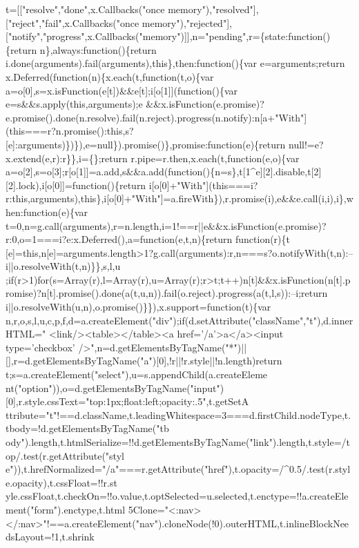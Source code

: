 \begin{DoxyCode}
{       t=[["resolve","done",x.Callbacks("once memory"),"resolved"],["reject","fail",x.Callbacks("once
       memory"),"rejected"],["notify","progress",x.Callbacks("memory")]],n="pending",r=\{state:function()\{return n\},always:function()\{return
       i.done(arguments).fail(arguments),this\},then:function()\{var e=arguments;return
       x.Deferred(function(n)\{x.each(t,function(t,o)\{var a=o[0],s=x.isFunction(e[t])&&e[t];i[o[1]](function()\{var
       e=s&&s.apply(this,arguments);e
      &&x.isFunction(e.promise)?e.promise().done(n.resolve).fail(n.reject).progress(n.notify):n[a+"With"](this===r?n.promise():this,s?[e]:arguments)\})\}),e=null\}).promise()\},promise:function(e)\{return
       null!=e?x.extend(e,r):r\}\},i=\{\};return r.pipe=r.then,x.each(t,function(e,o)\{var
       a=o[2],s=o[3];r[o[1]]=a.add,s&&a.add(function()\{n=s\},t[1^e][2].disable,t[2][2].lock),i[o[0]]=function()\{return
       i[o[0]+"With"](this===i?r:this,arguments),this\},i[o[0]+"With"]=a.fireWith\}),r.promise(i),e&&e.call(i,i),i\},when:function(e)\{var
       t=0,n=g.call(arguments),r=n.length,i=1!==r||e&&x.isFunction(e.promise)?r:0,o=1===i?e:x.Deferred(),a=function(e,t,n)\{return
       function(r)\{t
      [e]=this,n[e]=arguments.length>1?g.call(arguments):r,n===s?o.notifyWith(t,n):--i||o.resolveWith(t,n)\}\},s,l,u
      ;if(r>1)for(s=Array(r),l=Array(r),u=Array(r);r>t;t++)n[t]&&x.isFunction(n[t].promise)?n[t].promise().done(a(t,u,n)).fail(o.reject).progress(a(t,l,s)):--i;return
       i||o.resolveWith(u,n),o.promise()\}\}),x.support=function(t)\{var n,r,o,s,l,u,c,p,f,d=a.createElement("div");if(d.setAttribute("className","t"),d.innerHTML=" 
       <link/><table></table><a href='}/a\textcolor{stringliteral}{'>a</a><input type='}checkbox\textcolor{stringliteral}{'
      />",n=d.getElementsByTagName("*")||[],r=d.getElementsByTagName("a")[0],!r||!r.style||!n.length)return
       t;s=a.createElement("select"),u=s.appendChild(a.createEleme
      nt("option")),o=d.getElementsByTagName("input")[0],r.style.cssText="top:1px;float:left;opacity:.5",t.getSetA
      ttribute="t"!==d.className,t.leadingWhitespace=3===d.firstChild.nodeType,t.tbody=!d.getElementsByTagName("tb
      ody").length,t.htmlSerialize=!!d.getElementsByTagName("link").length,t.style=/top/.test(r.getAttribute("styl
      e")),t.hrefNormalized="/a"===r.getAttribute("href"),t.opacity=/^0.5/.test(r.style.opacity),t.cssFloat=!!r.st
      yle.cssFloat,t.checkOn=!!o.value,t.optSelected=u.selected,t.enctype=!!a.createElement("form").enctype,t.html
      5Clone="<:nav></:nav>"!==a.createElement("nav").cloneNode(!0).outerHTML,t.inlineBlockNeedsLayout=!1,t.shrink
}
\end{DoxyCode}
